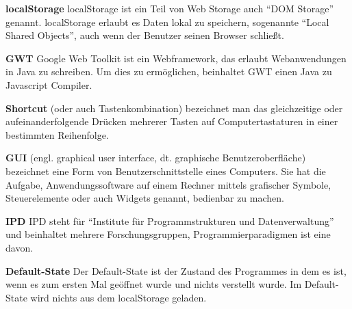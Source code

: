\documentclass[parskip=full,11pt,twoside]{scrartcl}
\begin{document}
\textbf{localStorage}
\newline
localStorage ist ein Teil von Web Storage auch \enquote{DOM Storage} genannt. localStorage erlaubt es Daten lokal zu speichern, sogenannte \enquote{Local Shared Objects}, auch wenn der Benutzer seinen Browser schließt.

\textbf{GWT}
\newline
Google Web Toolkit ist ein Webframework, das erlaubt Webanwendungen in Java zu schreiben. Um dies zu ermöglichen, beinhaltet GWT einen Java zu Javascript Compiler.

\textbf{Shortcut}
\newline
(oder auch Tastenkombination) bezeichnet man das gleichzeitige oder aufeinanderfolgende Drücken mehrerer Tasten auf Computertastaturen in einer bestimmten Reihenfolge.

\textbf{GUI}
\newline
(engl. graphical user interface, dt. graphische Benutzeroberfläche) bezeichnet eine Form von Benutzerschnittstelle eines Computers. Sie hat die Aufgabe, Anwendungssoftware auf einem Rechner mittels grafischer Symbole, Steuerelemente oder auch Widgets genannt, bedienbar zu machen.

\textbf{IPD}
\newline
IPD steht für \enquote{Institute für Programmstrukturen und Datenverwaltung} und beinhaltet mehrere Forschungsgruppen, Programmierparadigmen ist eine davon.

\textbf{Default-State}
\newline
Der Default-State ist der Zustand des Programmes in dem es ist, wenn es zum ersten Mal geöffnet wurde und nichts verstellt wurde. Im Default-State wird nichts aus dem localStorage geladen.
\end{document}

